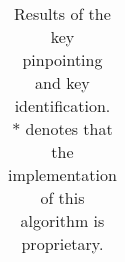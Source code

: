 \begin{table}[t]
{\begin{tabular}{l l c c c c c ccc}
 
 
\end{tabular}
}
\caption{Results of the key pinpointing and key identification. $\ast$ denotes that the implementation of this algorithm is proprietary.%
}\label{tab:lib_results}
\end{table}